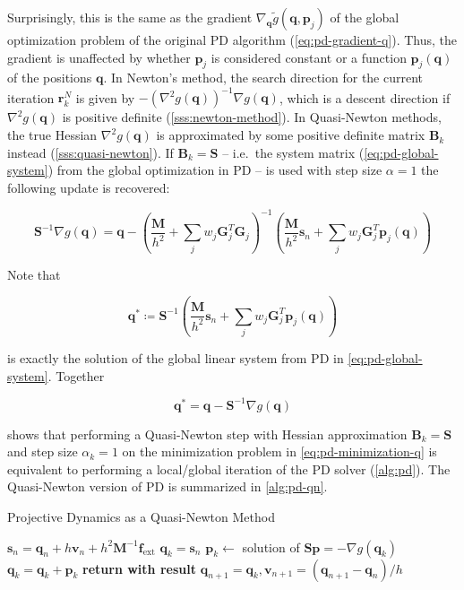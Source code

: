 Surprisingly, this is the same as the gradient $\nabla_{\bm{q}} \tilde{g}(\bm{q}, \bm{p}_j)$ of the global optimization problem of the original
PD algorithm (\cref{eq:pd-gradient-q}). Thus, the gradient is unaffected by whether $\bm{p}_j$ is considered constant or a function
$\bm{p}_j(\bm{q})$ of the positions $\bm{q}$. In Newton's method, the search direction for the current iteration $\bm{r}^N_k$ is given
by $-(\nabla^2 g(\bm{q}))^{-1} \nabla g(\bm{q})$, which is a descent direction if $\nabla^2 g(\bm{q})$ is positive definite 
(\cref{sss:newton-method}). In Quasi-Newton methods, the true Hessian $\nabla^2 g(\bm{q})$ is approximated by some positive definite matrix $\bm{B}_k$ 
instead (\cref{sss:quasi-newton}). If $\bm{B}_k = \bm{S}$ -- i.e.\ the system matrix 
(\cref{eq:pd-global-system}) from the global optimization in PD -- is used with step size $\alpha = 1$ the following update is recovered:

\[
    \bm{S}^{-1} \nabla g(\bm{q}) = 
    \bm{q} - (\frac{\bm{M}}{h^2} + \sum_j w_j \bm{G}_j^T \bm{G}_j)^{-1} 
    (\frac{\bm{M}}{h^2}\bm{s}_n + \sum_j w_j \bm{G}_j^T \bm{p}_j(\bm{q}))
\]

\noindent Note that 

\[
    \bm{q}^* \coloneqq \bm{S}^{-1} (\frac{\bm{M}}{h^2}\bm{s}_n + \sum_j w_j 
    \bm{G}_j^T \bm{p}_j(\bm{q}))
\]

\noindent is exactly the solution of the global linear system from PD in \cref{eq:pd-global-system}. Together

\[
    \bm{q}^* = \bm{q} -\bm{S}^{-1} \nabla g(\bm{q}) 
\]

\noindent shows that performing a Quasi-Newton step with Hessian approximation $\bm{B}_k = \bm{S}$ and step size 
$\alpha_k = 1$ on the 
minimization problem in \cref{eq:pd-minimization-q} is equivalent to performing a local/global iteration of the PD solver 
(\cref{alg:pd}). The Quasi-Newton version of PD is summarized in \cref{alg:pd-qn}.

\begin{algorithm}
\caption{Projective Dynamics as a Quasi-Newton Method}\label{alg:pd-qn}
\begin{algorithmic}
\State $\bm{s}_n = \bm{q}_n + h\bm{v}_n + h^2\bm{M}^{-1}\bm{f}_{\text{ext}}$
\State $\bm{q}_k = \bm{s}_n$
\State $\bm{p}_k \gets$ solution of $\bm{S}\bm{p} = -\nabla g(\bm{q}_k)$
\State $\bm{q}_k = \bm{q}_k + \bm{p}_k$
\EndFor
\State \textbf{return with result } $\bm{q}_{n+1} = \bm{q}_k, \bm{v}_{n+1} = (\bm{q}_{n+1} - \bm{q}_n)/h$
\EndProcedure
\end{algorithmic}
\end{algorithm}

